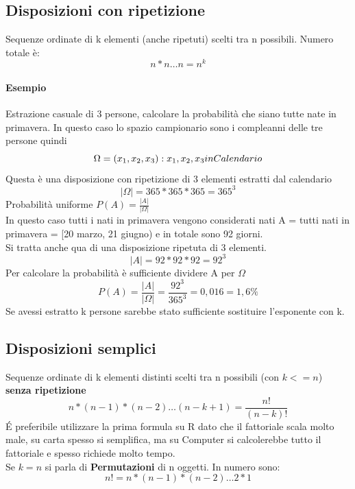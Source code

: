 \documentclass[12pt, a4paper, openany]{book}
\begin{document}
\subsection{Disposizioni con ripetizione}
Sequenze ordinate di k elementi (anche ripetuti) scelti tra n possibili. Numero totale è:
\begin{equation}
    n*n \dots n = n^k
\end{equation}
\paragraph{Esempio} Estrazione casuale di 3 persone, calcolare la probabilità che
siano tutte nate in primavera.
In questo caso lo spazio campionario sono i compleanni delle tre persone quindi
\begin{equation}
    \Omega = {(x_1, x_2, x_3): x_1, x_2, x_3 \\in Calendario}
\end{equation}
Questa è una disposizione con ripetizione di 3 elementi estratti dal calendario
\begin{equation}
    |\Omega| = 365*365*365 = 365^3
\end{equation}
Probabilità uniforme $P(A) = \frac{|A|}{|\Omega|}$
\\ In questo caso tutti i nati in primavera vengono considerati 
nati A = tutti  nati in primavera = [20 marzo, 21 giugno) e in totale sono 92 giorni.
\\ Si tratta anche qua di una disposizione ripetuta di 3 elementi.
\begin{equation}
    |A| = 92*92*92 = 92^3
\end{equation}
Per calcolare la probabilità è sufficiente dividere A per $\Omega$
\begin{equation}
    P(A) = \frac{|A|}{|\Omega|} = \frac{92^3}{365^3} = 0,016 = 1,6\%
\end{equation}
Se avessi estratto k persone sarebbe stato sufficiente sostituire l'esponente con k.

\subsection{Disposizioni semplici}
Sequenze ordinate di k elementi distinti scelti tra n possibili (con $k <= n$) 
\textbf{senza ripetizione}
\begin{equation}
    n*(n-1)*(n-2)\dots(n-k+1) = \frac{n!}{(n-k)!}
\end{equation}
\'E preferibile utilizzare la prima formula su R dato che il fattoriale scala molto male,
su carta spesso si semplifica, ma su Computer si calcolerebbe tutto il fattoriale e spesso richiede 
molto tempo.
\\ Se $k = n$ si parla di \textbf{Permutazioni} di n oggetti. In numero sono:
\begin{equation}
    n! = n*(n-1)*(n-2)\dots 2 * 1
\end{equation}
\end{document}
